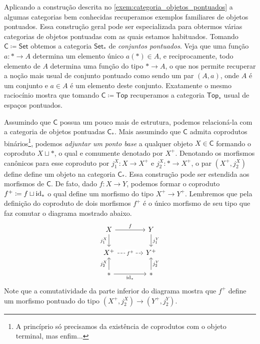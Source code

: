 \begin{exem}
  \label{exem:conjuntos_e_espacos_pontuados}
  Aplicando a construção descrita no \cref{exem:categoria_objetos_pontuados} a algumas categorias bem conhecidas recuperamos exemplos familiares de objetos pontuados.
   Essa construção geral pode ser especializada para obtermos várias categorias de objetos pontuadas com as quais estamos habituados.
  Tomando $\mathsf{C} \coloneqq \mathsf{Set}$ obtemos a categoria $\mathsf{Set_{*}}$ de \emph{conjuntos pontuados}.
  Veja que uma função $a: * \to A$ determina um elemento único $a(*) \in A$, e reciprocamente, todo elemento de $A$ determina uma função do tipo $* \to A$, o que nos permite recuperar a noção mais usual de conjunto pontuado como sendo um par $(A,a)$, onde $A$ é um conjunto e $a \in A$ é um elemento deste conjunto.
  Exatamente o mesmo raciocínio mostra que tomando $\mathsf{C} \coloneqq \mathsf{Top}$ recuperamos a categoria $\mathsf{Top_{*}}$ usual de espaços pontuados.
\end{exem}

Assumindo que $\mathsf{C}$ possua um pouco mais de estrutura, podemos relacioná-la com a categoria de objetos pontuadas $\mathsf{C}_{*}$.
Mais assumindo que $\mathsf{C}$ admita coprodutos binários\footnote{A princíprio só precisamos da existência de coprodutos com o objeto terminal, mas enfim...}, podemos \emph{adjuntar um ponto base} a qualquer objeto $X \in \mathsf{C}$ formando o coproduto $X \sqcup *$, o qual e comumente denotado por $X^{+}$.
Denotando os morfismos canônicos para esse coproduto por $j^{X}_{1}: X \to X^{+}$ e $j^{X}_{2}: * \to X^{+}$, o par $(X^{+}, j^{X}_{2})$ define define um objeto na categoria $\mathsf{C}_{*}$.
Essa construção pode ser estendida aos morfismos de $\mathsf{C}$.
De fato, dado $f: X \to Y$, podemos formar o coproduto $f^{+} \coloneqq f \sqcup \mathrm{id}_{*}$ o qual define um morfismo do tipo $X^{+} \to Y^{+}$.
Lembremos que pela definição do coproduto de dois morfismos $f^{+}$ é o único morfismo de seu tipo que faz comutar o diagrama mostrado abaixo.
\begin{equation}\label{eq:diagrama_adjuncao_ponto_base_em_morfismo}
  \begin{tikzcd}[column sep=1.3cm]
    X
    \arrow[r, "f"]
    \arrow[d, "j^{X}_{1}" swap]
    & Y
    \arrow[d, "j^{Y}_{1}"]
    \\ X^{+}
    \arrow[r, dashed, "f^{+}" description]
    & Y^{+}
    \\ *
    \arrow[u, "j^{X}_{2}"]
    \arrow[r, "\id_{*}" swap]
    & *
    \arrow[u, "j^{Y}_{2}" swap]
  \end{tikzcd}
\end{equation}
Note que a comutatividade da parte inferior do diagrama mostra que $f^{+}$ define um morfismo pontuado do tipo $(X^{+},j^{X}_{2}) \to (Y^{+},j^{Y}_{2})$.


